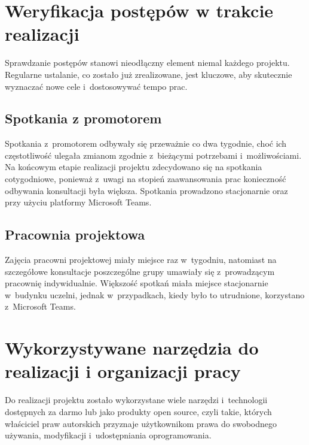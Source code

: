 \section{Weryfikacja postępów w trakcie realizacji}

Sprawdzanie postępów stanowi nieodłączny element niemal każdego
projektu. Regularne ustalanie, co zostało już zrealizowane, jest kluczowe,
aby skutecznie wyznaczać nowe cele i~dostosowywać tempo prac.


\subsection{Spotkania z promotorem}
Spotkania z~promotorem odbywały się przeważnie co dwa tygodnie, choć ich częstotliwość
ulegała zmianom zgodnie z~bieżącymi potrzebami i~możliwościami. Na końcowym etapie realizacji projektu zdecydowano
się na spotkania cotygodniowe, ponieważ z~uwagi na stopień zaawansowania prac konieczność odbywania
konsultacji była większa. Spotkania prowadzono stacjonarnie oraz przy użyciu platformy Microsoft Teams.

\subsection{Pracownia projektowa}
Zajęcia pracowni projektowej miały miejsce raz w~tygodniu, natomiast na szczegółowe konsultacje
poszczególne grupy umawiały się z~prowadzącym pracownię indywidualnie. Większość spotkań miała
miejsce stacjonarnie w~budynku uczelni, jednak w~przypadkach, kiedy było to utrudnione, korzystano
z~Microsoft Teams.



\section{Wykorzystywane narzędzia do realizacji i organizacji pracy}

Do realizacji projektu zostało wykorzystane wiele narzędzi i~technologii
dostępnych za darmo lub jako produkty open source, czyli takie,
których właściciel praw autorskich przyznaje użytkownikom prawa
do swobodnego używania, modyfikacji i~udostępniania oprogramowania.


